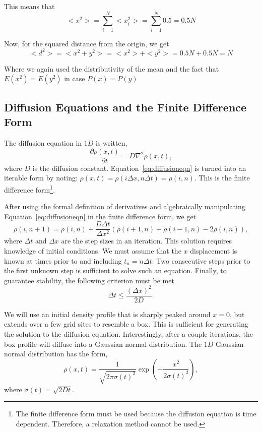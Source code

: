 \documentclass[12pt]{article}
\begin{document}
This means that 
\begin{equation}
    <x^2>=\sum_{i=1}^N <x_i^2>=\sum_{i=1}^N 0.5=0.5N
\end{equation}

Now, for the squared distance from the origin, we get
\begin{equation}
    <d^2>=<x^2+y^2>=<x^2>+<y^2>=0.5N+0.5N=N
\end{equation}

Where we again used the distributivity of the mean and the fact that $E(x^2)=E(y^2)$ in case $P(x)=P(y)$


\subsection{Diffusion Equations and the Finite Difference Form}
\label{sec:diffusionequation}
The diffusion equation in $1D$ is written,
\begin{equation}
  \label{eq:diffusioneqn}
  \frac{\partial\rho(x,t)}{\partial t} = D\nabla^2\rho(x,t),
\end{equation}
where $D$ is the diffusion constant. Equation~\ref{eq:diffusioneqn} is turned into an iterable form by noting: $\rho(x,t) = \rho(i\Delta x, n\Delta t) = \rho(i,n)$. This is the finite difference form\footnote{The finite difference form must be used because the diffusion equation is time dependent. Therefore, a relaxation method cannot be used.}.

After using the formal definition of derivatives and algebraically manipulating Equation~\ref{eq:diffusioneqn} in the finite difference form, we get
\begin{equation}
  \label{eq:diffusioneqn-iterable}
  \rho(i,n+1) = \rho(i,n) + \frac{D\Delta t}{\Delta x^2}\left(\rho(i+1,n) + \rho(i-1,n) - 2\rho(i,n)\right),
\end{equation}
where $\Delta t$ and $\Delta x$ are the step sizes in an iteration. This solution requires knowledge of initial conditions. We must assume that the $x$ displacement is known at times prior to and including $t_n = n\Delta t$. Two consecutive steps prior to the first unknown step is sufficient to solve such an equation. Finally, to guarantee stability, the following criterion must be met
\begin{equation}
  \label{eq:stabilitycriterion}
  \Delta t \leq \frac{(\Delta x)^2}{2D}.
\end{equation}

We will use an initial density profile that is sharply peaked around $x=0$, but extends over a few grid sites to resemble a box. This is sufficient for generating the solution to the diffusion equation. Interestingly, after a couple iterations, the box profile will diffuse into a Gaussian normal distribution. The $1D$ Gaussian normal distribution has the form,
\begin{equation}
  \label{eq:gaussiandistribution}
  \rho(x,t) = \frac{1}{\sqrt{2\pi\sigma(t)^2}}\exp\left(-\frac{x^2}{2\sigma(t)^2}\right),
\end{equation}
where $\sigma(t) = \sqrt{2Dt}$.
\end{document}
